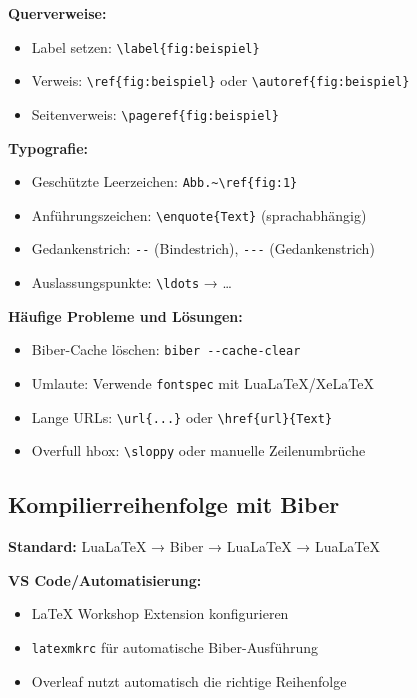 \documentclass[11pt,a4paper]{article}
\begin{document}
    \textbf{Querverweise:}
    \begin{itemize}
        \item Label setzen: \verb|\label{fig:beispiel}|
        \item Verweis: \verb|\ref{fig:beispiel}| oder \verb|\autoref{fig:beispiel}|
        \item Seitenverweis: \verb|\pageref{fig:beispiel}|
    \end{itemize}

    \textbf{Typografie:}
    \begin{itemize}
        \item Geschützte Leerzeichen: \verb|Abb.~\ref{fig:1}|
        \item Anführungszeichen: \verb|\enquote{Text}| (sprachabhängig)
        \item Gedankenstrich: \verb|--| (Bindestrich), \verb|---| (Gedankenstrich)
        \item Auslassungspunkte: \verb|\ldots| → …
    \end{itemize}

    \textbf{Häufige Probleme und Lösungen:}
    \begin{itemize}
        \item Biber-Cache löschen: \verb|biber --cache-clear|
        \item Umlaute: Verwende \verb|fontspec| mit LuaLaTeX/XeLaTeX
        \item Lange URLs: \verb|\url{...}| oder \verb|\href{url}{Text}|
        \item Overfull hbox: \verb|\sloppy| oder manuelle Zeilenumbrüche
    \end{itemize}

    \subsection*{Kompilierreihenfolge mit Biber}
    \textbf{Standard:} LuaLaTeX → Biber → LuaLaTeX → LuaLaTeX

    \textbf{VS Code/Automatisierung:}
    \begin{itemize}
        \item LaTeX Workshop Extension konfigurieren
        \item \verb|latexmkrc| für automatische Biber-Ausführung
        \item Overleaf nutzt automatisch die richtige Reihenfolge
    \end{itemize}


\end{document}
